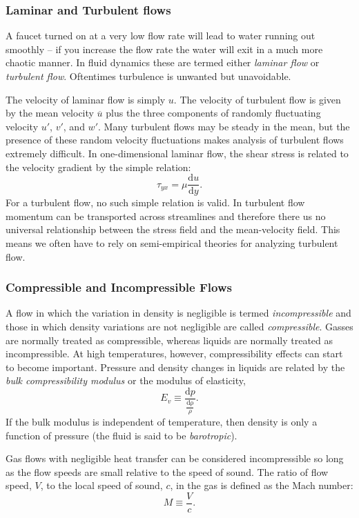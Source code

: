 \subsubsection{Laminar and Turbulent flows}
A faucet turned on at a very low flow rate will lead to water running out smoothly -- if you increase the flow rate the water will exit in a much more chaotic manner. In fluid dynamics these are termed either \textit{laminar flow} or \textit{turbulent flow}. Oftentimes turbulence is unwanted but unavoidable.

The velocity of laminar flow is simply $u$. The velocity of turbulent flow is given by the mean velocity $\overline{u}$ plus the three components of randomly fluctuating velocity $u'$, $v'$, and $w'$. Many turbulent flows may be steady in the mean, but the presence of these random velocity fluctuations makes analysis of turbulent flows extremely difficult. In one-dimensional laminar flow, the shear stress is related to the velocity gradient by the simple relation:
\[ 
\tau_{yx} = \mu \frac{\mathrm{d}u}{\mathrm{d}y} 
.\]
For a turbulent flow, no such simple relation is valid. In turbulent flow momentum can be transported across streamlines and therefore there us no universal relationship between the stress field and the mean-velocity field. This means we often have to rely on semi-empirical theories for analyzing turbulent flow.

\subsubsection{Compressible and Incompressible Flows}
A flow in which the variation in density is negligible is termed \textit{incompressible} and those in which density variations are not negligible are called \textit{compressible}. Gasses are normally treated as compressible, whereas liquids are normally treated as incompressible. At high temperatures, however, compressibility effects can start to become important. Pressure and density changes in liquids are related by the \textit{bulk compressibility modulus} or the modulus of elasticity,
\[ 
E_v \equiv \frac{\mathrm{d}p}{\frac{\mathrm{d\rho}}{\rho}}
.\]
If the bulk modulus is independent of temperature, then density is only a function of pressure (the fluid is said to be \textit{barotropic}).

Gas flows with negligible heat transfer can be considered incompressible so long as the flow speeds are small relative to the speed of sound. The ratio of flow speed, $V$, to the local speed of sound, $c$, in the gas is defined as the Mach number:
\[ 
M \equiv \frac{V}{c}
.\]

